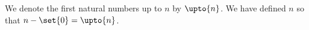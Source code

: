 We denote the first natural numbers up to $n$ by $\upto{n}$.
We have defined $n$ so that $n - \set{0} = \upto{n}$.


%
%
%

%
%
%
%
%
%
%
%
%
